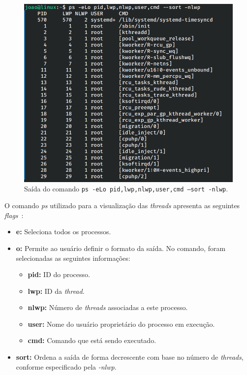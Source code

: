\documentclass[
	12pt,				%
	oneside,   	        %
	a4paper,			%
	english,			%
	french,				%
	spanish,			%
	brazil,				%
	]{pacotes/abntex2}
\begin{document}
\begin{figure}[H]
  \centering
  \includegraphics[scale=0.45]{figuras/ps.png}
  \caption{Saída do comando \texttt{ps -eLo pid,lwp,nlwp,user,cmd --sort -nlwp}.}
  \label{fig:ps}
\end{figure}

O comando \textit{ps} utilizado para a visualização das \textit{threads} apresenta as seguintes \textit{flags}~\cite{shotts2017}:

\begin{itemize}
    \item \textbf{e:} Seleciona todos os processos.
    \item \textbf{o:} Permite ao usuário definir o formato da saída. No comando, foram selecionadas as seguintes informações:
    \begin{itemize}
        \item \textbf{pid:} ID do processo.
        \item \textbf{lwp:} ID da \textit{thread}.
        \item \textbf{nlwp:} Número de \textit{threads} associadas a este processo.
        \item \textbf{user:} Nome do usuário proprietário do processo em execução.
        \item \textbf{cmd:} Comando que está sendo executado.
    \end{itemize}
    \item \textbf{sort:} Ordena a saída de forma decrescente com base no número de \textit{threads}, conforme especificado pela \textit{-nlwp}.
\end{itemize}
\end{document}
